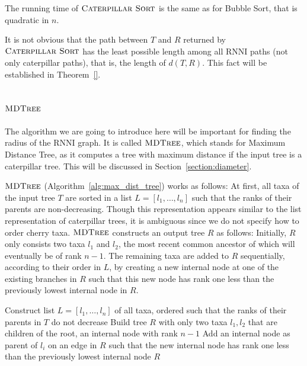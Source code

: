 \documentclass{amsart}
\newcommand{\rnni}{\mathrm{RNNI}}
\newcommand{\csort}{\textsc{Caterpillar Sort}}
\newcommand{\mdtree}{\textsc{MDTree}}
\begin{document}
The running time of $\csort$ is the same as for Bubble Sort, that is quadratic in $n$.

It is not obvious that the path between $T$ and $R$ returned by $\csort$ has the least possible length among all $\rnni$ paths (not only caterpillar paths), that is, the length of $d(T, R)$.
This fact will be established in Theorem~\ref{}.

\subsection{$\mdtree$}
\label{section:alg_mdtree}

The algorithm we are going to introduce here will be important for finding the radius of the $\rnni$ graph.
It is called $\mdtree$, which stands for Maximum Distance Tree, as it computes a tree with maximum distance if the input tree is a caterpillar tree.
This will be discussed in Section~\ref{section:diameter}.

$\mdtree$ (Algorithm~\ref{alg:max_dist_tree}) works as follows:
At first, all taxa of the input tree $T$ are sorted in a list $L = [l_1, \ldots, l_n]$ such that the ranks of their parents are non-decreasing.
Though this representation appears similar to the list representation of caterpillar trees, it is ambiguous since we do not specify how to order cherry taxa.
$\mdtree$ constructs an output tree $R$ as follows:
Initially, $R$ only consists two taxa $l_1$ and $l_2$, the most recent common ancestor of which will eventually be of rank $n - 1$.
The remaining taxa are added to $R$ sequentially, according to their order in $L$, by creating a new internal node at one of the existing branches in $R$ such that this new node has rank one less than the previously lowest internal node in $R$.

\begin{algorithm}[H]
\caption{$\mdtree(T)$}
\label{alg:max_dist_tree}
\begin{algorithmic}[1]
\STATE Construct list $L=[l_1, \ldots, l_n]$ of all taxa, ordered such that the ranks of their parents in $T$ do not decrease \label{alg:mdtree_lineL}
\STATE Build tree $R$ with only two taxa $l_1, l_2$ that are children of the root, an internal node with rank $n-1$
\STATE Add an internal node as parent of $l_i$ on an edge in $R$ such that the new internal node has rank one less than the previously lowest internal node \label{alg:mdtree_lineAddTaxon}
\ENDFOR
\RETURN $R$
\end{algorithmic}
\end{algorithm}
\end{document}
